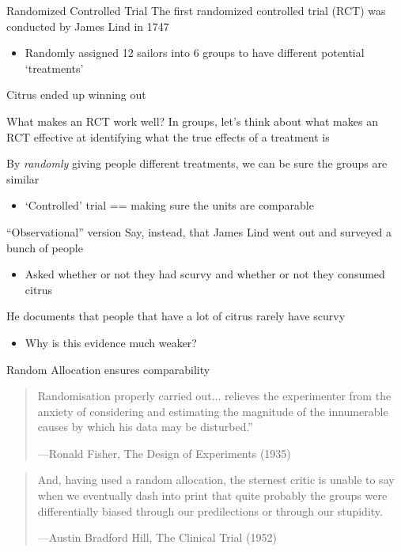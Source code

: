 \documentclass[aspectratio=169,t,11pt,table]{beamer}
\begin{document}
\begin{frame}{Randomized Controlled Trial}
  The first randomized controlled trial (RCT) was conducted by James Lind in 1747
  \begin{itemize}
    \item Randomly assigned 12 sailors into 6 groups to have different potential `treatments'
  \end{itemize}

  \bigskip
  Citrus ended up winning out
\end{frame}

\begin{frame}{What makes an RCT work well?}
  In groups, let's think about what makes an RCT effective at identifying what the true effects of a treatment is

  \pause
  By \emph{randomly} giving people different treatments, we can be sure the groups are similar
  \begin{itemize}
    \item `Controlled' trial == making sure the units are comparable
  \end{itemize}
\end{frame}

\begin{frame}{``Observational'' version}
  Say, instead, that James Lind went out and surveyed a bunch of people
  \begin{itemize}
    \item Asked whether or not they had scurvy and whether or not they consumed citrus
  \end{itemize}
  
  \bigskip
  He documents that people that have a lot of citrus rarely have scurvy
  \begin{itemize}
    \item Why is this evidence much weaker? 
  \end{itemize}
\end{frame}

\begin{frame}{Random Allocation ensures comparability}
  \bigskip
  \begin{quote}
    Randomisation properly carried out... relieves the experimenter from the anxiety of considering and estimating the magnitude of the innumerable causes by which his data may be disturbed.”

    \textnormal{—Ronald Fisher, The Design of Experiments (1935)}
  \end{quote}
  
  \pause
  \bigskip
  \bigskip
  \begin{quote}
    And, having used a random allocation, the sternest critic is unable to say when we eventually dash into print that quite probably the groups were differentially biased through our predilections or through our stupidity.

    \textnormal{—Austin Bradford Hill, The Clinical Trial (1952)}
  \end{quote}
\end{frame}
\end{document}

